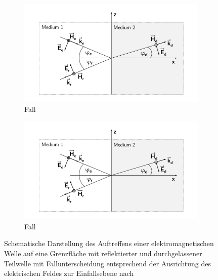 \begin{figure}[ht]
    \centering
    \begin{subfigure}[b]{0.45\textwidth}
        \includegraphics[page = 1, width=\textwidth, trim = 3.5cm 1cm 3.5cm 1cm, clip]{Abbildungen/Kapitel2/Wellenreflektion.pdf}
        \caption{Fall \label{subfig:2_Wellenreflektion_Fall1}}
    \end{subfigure}
    \hspace{1cm}
    \begin{subfigure}[b]{0.45\textwidth}
        \includegraphics[page = 2, width=\textwidth, trim = 3.5cm 1cm 3.5cm 1cm, clip]{Abbildungen/Kapitel2/Wellenreflektion.pdf}
        \caption{Fall \label{subfig:2_Wellenreflektion_Fall2}}
    \end{subfigure}
    \caption[Schematische Darstellung des Auftreffens einer elektromagnetischen Welle auf eine Grenzfläche mit reflektierter und durchgelassener Teilwelle]{Schematische Darstellung des Auftreffens einer elektromagnetischen Welle auf eine Grenzfläche mit reflektierter und durchgelassener Teilwelle mit Fallunterscheidung entsprechend der Ausrichtung des elektrischen Feldes zur Einfallsebene nach~\cite{EM_Schirmung}}
    \label{fig:2_Wellenreflektion}
\end{figure}

